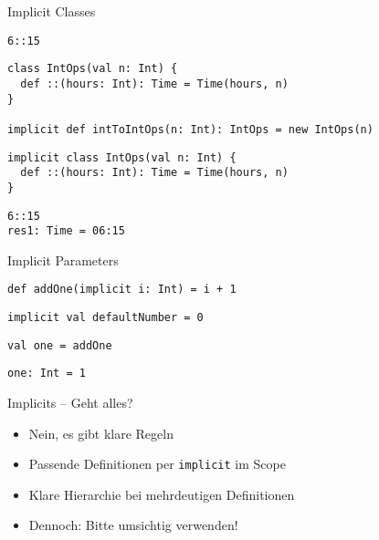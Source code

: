 \documentclass[14pt,aspectratio=169,trans]{beamer} %
\begin{document}
\begin{frame}[fragile]{}
	\begin{block}{Implicit Classes}
		\scriptsize
		\onslide<2->
  \begin{lstlisting}
6::15
	\end{lstlisting}
\begin{lstlisting}[firstnumber=2]
class IntOps(val n: Int) {
  def ::(hours: Int): Time = Time(hours, n)
}

implicit def intToIntOps(n: Int): IntOps = new IntOps(n)
\end{lstlisting}
\begin{lstlisting}[firstnumber=7]
implicit class IntOps(val n: Int) {
  def ::(hours: Int): Time = Time(hours, n)
}
\end{lstlisting}
\begin{lstlisting}[firstnumber=10]
6::15
res1: Time = 06:15
\end{lstlisting}
	\end{block}
\end{frame}

\begin{frame}[fragile]{}
	\begin{block}{Implicit Parameters}
		\scriptsize
		\onslide<2->
  \begin{lstlisting}
def addOne(implicit i: Int) = i + 1
	\end{lstlisting}
\begin{lstlisting}[firstnumber=5]
implicit val defaultNumber = 0
\end{lstlisting}
\begin{lstlisting}[firstnumber=5]
val one = addOne
\end{lstlisting}
\begin{lstlisting}[firstnumber=5]
one: Int = 1
\end{lstlisting}
	\end{block}
	\note{}
\end{frame}

\begin{frame}{}
	\begin{block}{Implicits -- Geht alles?}
		\begin{itemize}
			\item<2->Nein, es gibt klare Regeln
			\item<3->Passende Definitionen per \texttt{implicit} im Scope
			\item<4->Klare Hierarchie bei mehrdeutigen Definitionen
			\item<5->Dennoch: Bitte umsichtig verwenden!
		\end{itemize}
	\end{block}
\end{frame}
\end{document}

